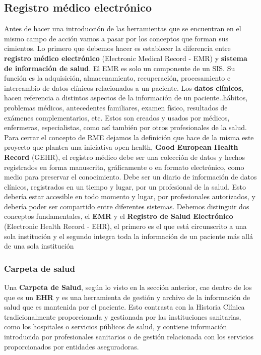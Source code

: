 \subsection{Registro médico electrónico}
	Antes de hacer una introducción de las herramientas que se encuentran en el mismo campo de acción vamos a pasar por los conceptos que forman sus cimientos.
Lo primero que debemos hacer es establecer la diferencia entre \textbf{registro médico electrónico} (Electronic Medical Record - EMR) y \textbf{sistema de información de salud}. El EMR es solo un componente de un SIS. Su función es la adquisición, almacenamiento, recuperación, procesamiento e intercambio de datos clínicos relacionados a un paciente. Los \textbf{datos clínicos}, hacen referencia a distintos aspectos de la información de un paciente..hábitos, problemas médicos, antecedentes familiares, examen físico, resultados de exámenes complementarios, etc. Estos son creados y usados por médicos, enfermeras, especialistas, como así también por otros profesionales de la salud. Para cerrar el concepto de RME dejamos la definición que hace de la misma este proyecto que plantea una iniciativa open health, \textbf{Good European Health Record} (GEHR), el registro médico debe ser una colección de datos y hechos registrados en forma manuscrita, gráficamente o en formato electrónico, como medio para preservar el conocimiento. Debe ser un diario de información de datos clínicos, registrados en un tiempo y lugar, por un profesional de la salud. Esto debería estar accesible en todo momento y lugar, por profesionales autorizados, y debería poder ser compartido entre diferentes sistemas. Debemos distinguir dos conceptos fundamentales, el \textbf{EMR} y el \textbf{Registro de Salud Electrónico} (Electronic Health Record - EHR), el primero es el que está circunscrito a una sola institución y el segundo integra toda la información de un paciente más allá de una sola institución

\subsubsection{Carpeta de salud}
Una \textbf{Carpeta de Salud}, según lo visto en la sección anterior, cae dentro de los que es un \textbf{EHR} y es una herramienta de gestión y archivo de la información de salud que es mantenida por el paciente.
Esto contrasta con la Historia Clínica tradicionalmente proporcionada y gestionada por las instituciones sanitarias,
como los hospitales o servicios públicos de salud,
y contiene información introducida por profesionales sanitarios o de gestión relacionada con los servicios proporcionados por entidades aseguradoras.

